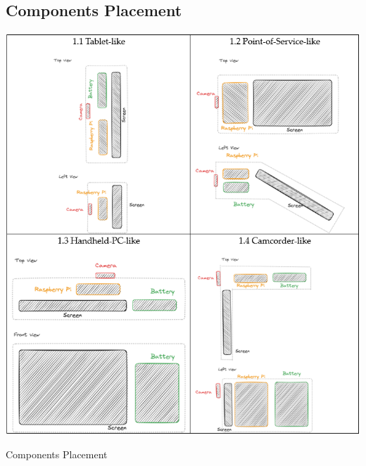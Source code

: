 \subsection{Components Placement}
\begin{table}[H]
    \centering
    \includegraphics[width=\linewidth]{texs/Part1/chapter3/image/s1.png}
    \caption{Components Placement}
    \label{tab:components-placement}
\end{table}



